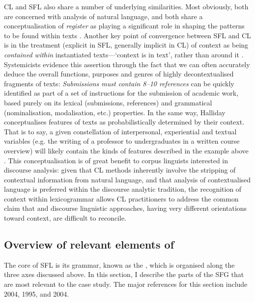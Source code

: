 \gls{CL} and \gls{SFL} also share a number of underlying similarities. Most obviously, both are concerned with analysis of natural language, and both share a conceptualisation of \emph{register} as playing a significant role in shaping the  patterns to be found within texts \cite{hunston_systemic_2013}. Another key point of convergence between \gls{SFL} and \gls{CL} is in the treatment (explicit in \gls{SFL}, generally implicit in \gls{CL}) of context as being \emph{contained within} instantiated texts---`context is in text', rather than around it \cite{eggins_introduction_2004}. Systemicists evidence this assertion through the fact that we can often accurately deduce the overall functions, purposes and genres of highly decontextualised fragments of texts: \emph{Submissions must contain 8--10 references} can be quickly identified as part of a set of instructions for the submission of academic work, based purely on its lexical (submissions, references) and grammatical (nominalisation, modalisation, etc.) properties. In the same way, Halliday conceptualises  features of texts as probabilistically determined by their context. That is to say, a given constellation of interpersonal, experiential and textual variables (e.g. the writing of a professor to undergraduates in a written course overview) will likely contain the kinds of  features described in the example above \cite{halliday_corpus_1991}. This conceptualisation is of great benefit to corpus linguists interested in discourse analysis: given that \gls{CL} methods inherently involve the stripping of contextual information from natural language, and that analysis of contextualised language is preferred within the discourse analytic tradition, the recognition of context within \gls{lexicogrammar} allows \gls{CL} practitioners to address the common claim  \cite[e.g.][]{virtanen_discourse_2009} that  and discourse linguistic approaches, having very different orientations toward context, are difficult to reconcile.

\subsection{Overview of relevant elements of }

The core of \gls{SFL} is its grammar, known as the , which is organised along the three axes discussed above. In this section, I describe the parts of the \gls{SFG} that are most relevant to the case study. The major references for this section include \citeauthor{halliday_introduction_2004} 2004, \citeauthor{matthiessen_lexicogrammatical_1995} 1995, and \citeauthor{eggins_introduction_2004} 2004.

